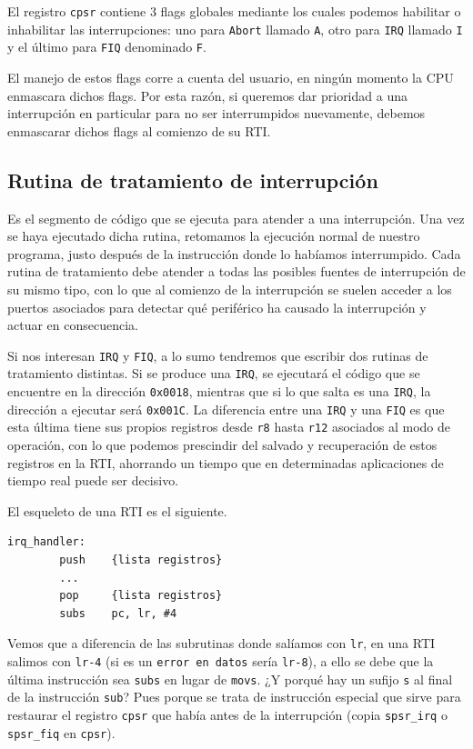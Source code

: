 El registro {\tt cpsr} contiene 3 flags globales mediante los cuales podemos habilitar o
inhabilitar las interrupciones: uno para {\tt Abort} llamado {\tt A}, otro para
{\tt IRQ} llamado {\tt I} y el último para {\tt FIQ} denominado {\tt F}.

El manejo de estos flags corre a cuenta del usuario, en ningún momento la CPU enmascara
dichos flags. Por esta razón, si queremos dar prioridad a una interrupción en particular
para no ser interrumpidos nuevamente, debemos enmascarar dichos flags al comienzo de su RTI.

\subsection{Rutina de tratamiento de interrupción}

Es el segmento de código que se ejecuta para atender a una interrupción. Una vez se haya
ejecutado dicha rutina, retomamos la ejecución normal de nuestro programa, justo después de la instrucción
donde lo habíamos interrumpido. Cada rutina de tratamiento debe atender a todas las posibles
fuentes de interrupción de su mismo tipo, con lo que al comienzo de la interrupción se suelen
acceder a los puertos asociados para detectar qué periférico ha causado la interrupción y
actuar en consecuencia.

Si nos interesan {\tt IRQ} y {\tt FIQ}, a lo sumo tendremos que escribir dos
rutinas de tratamiento distintas. Si se produce una {\tt IRQ}, se ejecutará el código
que se encuentre en la dirección {\tt 0x0018}, mientras que si lo que salta es una {\tt IRQ},
la dirección a ejecutar será {\tt 0x001C}. La diferencia entre una {\tt IRQ} y una
{\tt FIQ} es que esta última tiene sus propios registros desde {\tt r8} hasta {\tt r12}
asociados al modo de operación, con lo que podemos prescindir del salvado y recuperación
de estos registros en la RTI, ahorrando un tiempo que en determinadas aplicaciones de
tiempo real puede ser decisivo.

El esqueleto de una RTI es el siguiente.

\begin{lstlisting}
irq_handler:
        push    {lista registros}
        ...
        pop     {lista registros}
        subs    pc, lr, #4
\end{lstlisting}

Vemos que a diferencia de las subrutinas donde salíamos con {\tt lr}, en una RTI salimos
con {\tt lr-4} (si es un {\tt error en datos} sería {\tt lr-8}), a ello se debe que la última
instrucción sea {\tt subs} en lugar de {\tt movs}.
¿Y porqué hay un sufijo {\tt s} al final
de la instrucción {\tt sub}? Pues porque se trata de instrucción especial que sirve para
restaurar el registro {\tt cpsr} que había antes de la interrupción (copia {\tt spsr\_irq} o
{\tt spsr\_fiq} en {\tt cpsr}).

